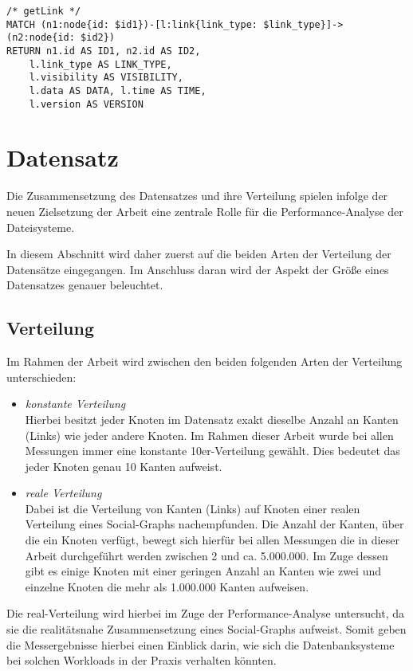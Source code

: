 \begin{lstlisting}[label=src:cypher_id_queries,caption={Cypher ID-Queries},language=CQL]
/* getLink */
MATCH (n1:node{id: $id1})-[l:link{link_type: $link_type}]->(n2:node{id: $id2}) 
RETURN n1.id AS ID1, n2.id AS ID2, 
    l.link_type AS LINK_TYPE, 
    l.visibility AS VISIBILITY, 
    l.data AS DATA, l.time AS TIME, 
    l.version AS VERSION
\end{lstlisting}

\section{Datensatz}
Die Zusammensetzung des Datensatzes und ihre Verteilung spielen infolge der neuen Zielsetzung der Arbeit eine zentrale Rolle für die Performance-Analyse der Dateisysteme.

In diesem Abschnitt wird daher zuerst auf die beiden Arten der Verteilung der Datensätze eingegangen. Im Anschluss daran wird der Aspekt der Größe eines Datensatzes genauer beleuchtet.

\subsection{Verteilung}
Im Rahmen der Arbeit wird zwischen den beiden folgenden Arten der Verteilung unterschieden:
\begin{itemize}
    \item \textit{konstante Verteilung}\\
    Hierbei besitzt jeder Knoten im Datensatz exakt dieselbe Anzahl an Kanten (Links) wie jeder andere Knoten. Im Rahmen dieser Arbeit wurde bei allen Messungen immer eine konstante 10er-Verteilung gewählt. Dies bedeutet das jeder Knoten genau 10 Kanten aufweist.  
    \item \textit{reale Verteilung}\\
    Dabei ist die Verteilung von Kanten (Links) auf Knoten einer realen Verteilung eines Social-Graphs nachempfunden. Die Anzahl der Kanten, über die ein Knoten verfügt, bewegt sich hierfür bei allen Messungen die in dieser Arbeit durchgeführt werden zwischen 2 und ca. 5.000.000. Im Zuge dessen gibt es einige Knoten mit einer geringen Anzahl an Kanten wie zwei und einzelne Knoten die mehr als 1.000.000 Kanten aufweisen. 
\end{itemize}
Die real-Verteilung wird hierbei im Zuge der Performance-Analyse untersucht, da sie die realitätsnahe Zusammensetzung eines Social-Graphs aufweist. Somit geben die Messergebnisse hierbei einen Einblick darin, wie sich die Datenbanksysteme bei solchen Workloads in der Praxis verhalten könnten.

